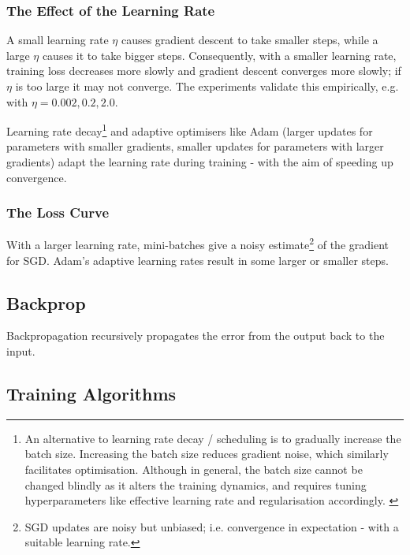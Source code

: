 \subsubsection{The Effect of the Learning Rate}
\label{subsubsection:learning-rate}

A small learning rate $\eta$ causes gradient descent to take smaller steps, while a large $\eta$ causes it to take bigger steps.
Consequently, with a smaller learning rate, training loss decreases more slowly and gradient descent converges more slowly;
if $\eta$ is too large it may not converge.
The experiments validate this empirically, e.g. with $\eta = 0.002, 0.2, 2.0$.

Learning rate decay\footnote{
    An alternative to learning rate decay / scheduling is to gradually increase the batch size. \citep{smith2017dontdecaythelearningrate}
    Increasing the batch size reduces gradient noise, which similarly facilitates optimisation.
    Although in general, the batch size cannot be changed blindly as it alters the training dynamics, and
    requires tuning hyperparameters like effective learning rate and regularisation accordingly.
    \citep{tuningplaybookgithub}
} \citep{you2019doeslearningratedecay} and
adaptive optimisers like Adam \citep{kingma2017adammethodstochasticoptimization}
(larger updates for parameters with smaller gradients, smaller updates for parameters with larger gradients)
adapt the learning rate during training - with the aim of speeding up convergence.

\subsubsection{The Loss Curve}

With a larger learning rate, mini-batches give a noisy estimate\footnote{
    SGD updates are noisy but unbiased; i.e. convergence in expectation - with a suitable learning rate.
} of the gradient for SGD.
Adam's adaptive learning rates result in some larger or smaller steps.

\subsection{Backprop}

Backpropagation recursively propagates the error from the output back to the input.


\subsection{Training Algorithms}
\label{subsection:training-algorithms}

